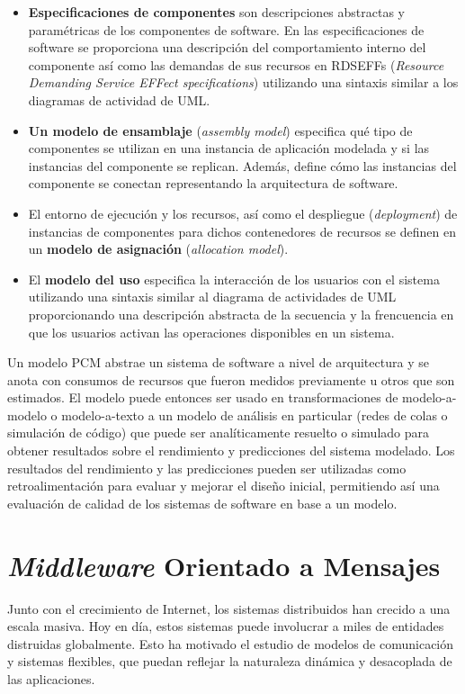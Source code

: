 \documentclass[conference]{IEEEtran}
\begin{document}
\begin{itemize}
    \item \textbf{Especificaciones de componentes} son descripciones abstractas y paramétricas de los componentes de software. En las especificaciones de software se proporciona una descripción del comportamiento interno del componente así como las demandas de sus recursos en RDSEFFs (\emph{Resource Demanding Service EFFect specifications}) utilizando una sintaxis similar a los diagramas de actividad de UML.
    \item \textbf{Un modelo de ensamblaje} (\emph{assembly model}) especifica qué tipo de componentes se utilizan en una instancia de aplicación modelada y si las instancias del componente se replican. Además, define cómo las instancias del componente se conectan representando la arquitectura de software.
    \item El entorno de ejecución y los recursos, así como el despliegue (\emph{deployment}) de instancias de componentes para dichos contenedores de recursos se definen en un \textbf{modelo de asignación} (\emph{allocation model}).
    \item El \textbf{modelo del uso} especifica la interacción de los usuarios con el sistema utilizando una sintaxis similar al diagrama de actividades de UML proporcionando una descripción abstracta de la secuencia y la frencuencia en que los usuarios activan las operaciones disponibles en un sistema.
\end{itemize}

Un modelo PCM abstrae un sistema de software a nivel de arquitectura y se anota con consumos de recursos que fueron medidos previamente u otros que son estimados. El modelo puede entonces ser usado en transformaciones de modelo-a-modelo o modelo-a-texto a un modelo de análisis en particular (redes de colas o simulación de código) que puede ser analíticamente resuelto o simulado para obtener resultados sobre el rendimiento y predicciones del sistema modelado. Los resultados del rendimiento y las predicciones pueden ser utilizadas como retroalimentación para evaluar y mejorar el diseño inicial, permitiendo así una evaluación de calidad de los sistemas de software en base a un modelo\cite{noorshams}. 

\section{\emph{Middleware} Orientado a Mensajes} \label{sec:mom}
Junto con el crecimiento de Internet, los sistemas distribuidos han crecido a una escala masiva. Hoy en día, estos sistemas puede involucrar a miles de entidades distruidas globalmente. Esto ha motivado el estudio de modelos de comunicación y sistemas flexibles, que puedan reflejar la naturaleza dinámica y desacoplada de las aplicaciones.
\end{document}
